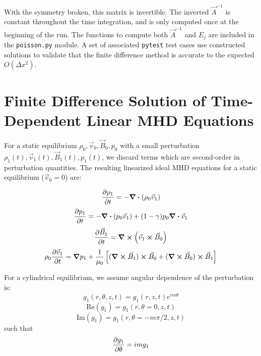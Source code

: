 \documentclass[%
 reprint,
 amsmath,amssymb,
 aps,
]{revtex4-2}
\begin{document}
With the symmetry broken, this matrix is invertible. The inverted $\vec A^{-1}$ is constant throughout the time integration, and is only computed once at the beginning of the run. The functions to compute both $\vec A^{-1}$ and $E_j$ are included in the \texttt{poisson.py} module. A set of associated \texttt{pytest} test cases use constructed solutions to validate that the finite difference method is accurate to the expected $O(\Delta x ^2)$.


\section{Finite Difference Solution of Time-Dependent Linear MHD Equations}

For a static equilibrium $\rho_0, \vec v _0, \vec B_0, p_0$ with a small perturbation $\rho_1(t), \vec v_1(t), \vec B_1(t), p_1(t)$, we discard terms which are second-order in perturbation quantities. The resulting linearized ideal MHD equations for a static equilibrium ($\vec v_0 = 0$) are:

\begin{equation}
\pdv{\rho_1}{t} = - \div ( \rho_0 \vec v_1)    
\end{equation}
\begin{equation}
\pdv{p_1}{t} = - \div (p_0 \vec v _1) + (1 - \gamma) p_0 \div \vec v_1 
\end{equation}
\begin{equation}
\pdv{\vec B_1}{t} = \curl ( \vec v_1 \cross \vec B_0)
\end{equation}
\begin{equation}
\rho_0 \pdv{\vec v_1}{t} = \grad p_1 + \frac{1}{\mu_0} \left[ (\curl \vec B_1) \cross \vec B_0 + (\curl \vec B_0) \cross \vec B_1 \right]
\end{equation}

For a cylindrical equilibrium, we assume angular dependence of the perturbation is:
\begin{equation}
g_1 (r, \theta, z, t) = g_1(r, z, t) e^{i m \theta}
\end{equation}
\begin{equation}
\text{Re}(g_1) = g_1(r, \theta=0, z, t)
\end{equation}
\begin{equation}
\text{Im}(g_1) = g_1(r, \theta=- m \pi/2, z, t)
\end{equation}
such that
\begin{equation}
\pdv{g_1}{\theta} = i m g_1
\end{equation}
\end{document}
